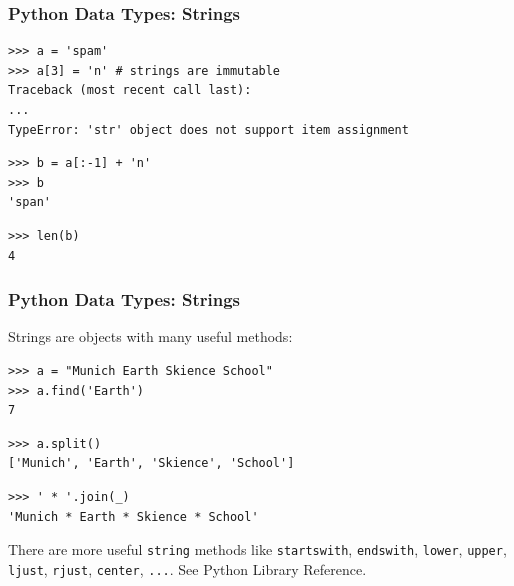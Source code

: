 \documentclass[t,10pt,compress=false,usepdftitle=false]{beamer}
\begin{document}
\begin{frame}[fragile]
    \frametitle{Python Data Types: Strings}
    \begin{myColorBox}{0.9}{}
\begin{verbatim}
>>> a = 'spam'
>>> a[3] = 'n' # strings are immutable
Traceback (most recent call last):
...
TypeError: 'str' object does not support item assignment
\end{verbatim}
    \end{myColorBox}
    \pause
    \begin{myColorBox}{0.9}{}
\begin{verbatim}
>>> b = a[:-1] + 'n'
>>> b
'span'
\end{verbatim}
    \end{myColorBox}
    \pause
    \begin{myColorBox}{0.9}{}
\begin{verbatim}
>>> len(b)
4
\end{verbatim}
    \end{myColorBox}
\end{frame}


\begin{frame}[fragile]
    \frametitle{Python Data Types: Strings}
    Strings are objects with many useful methods:
    \begin{myColorBox}{0.9}{}
\begin{verbatim}
>>> a = "Munich Earth Skience School"
>>> a.find('Earth')
7
\end{verbatim}
    \end{myColorBox}
    \pause
    \begin{myColorBox}{0.9}{}
\begin{verbatim}
>>> a.split()
['Munich', 'Earth', 'Skience', 'School']
\end{verbatim}
    \end{myColorBox}
    \pause
    \begin{myColorBox}{0.9}{}
\begin{verbatim}
>>> ' * '.join(_)
'Munich * Earth * Skience * School'
\end{verbatim}
    \end{myColorBox}
    There are more useful \verb#string# methods like \verb#startswith#, \verb#endswith#, \verb#lower#, \verb#upper#,
    \verb#ljust#, \verb#rjust#, \verb#center#, \verb#...#. See Python Library Reference.
\end{frame}
\end{document}

